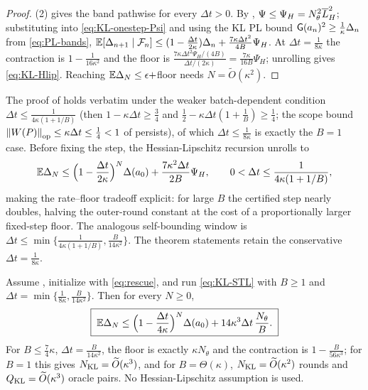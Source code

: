 \begin{proof}
(2) gives the band pathwise for every $\Delta t>0$. By ,
$\Psi\leq\Psi_H=N_\theta^2\overline{L}_H^2$; substituting into \eqref{eq:KL-onestep-Psi} and using the KL
PL bound $\mathsf{G}(a_n)^2\geq\tfrac1\kappa\Delta_n$ from \eqref{eq:PL-bands},
$\mathbb{E}[\Delta_{n+1}\mid\mathcal{F}_n]\leq(1-\tfrac{\Delta t}{2\kappa})\Delta_n+\tfrac{7\kappa\Delta t^2}{4B}\Psi_H$.
At $\Delta t=\tfrac1{8\kappa}$ the contraction is $1-\tfrac1{16\kappa^2}$ and the floor is
$\tfrac{7\kappa\Delta t^2\Psi_H/(4B)}{\Delta t/(2\kappa)}=\tfrac{7\kappa}{16B}\Psi_H$; unrolling gives
\eqref{eq:KL-Hlip}. Reaching $\mathbb{E}\Delta_N\leq\epsilon+$floor needs $N=\widetilde O(\kappa^2)$.
\end{proof}

\begin{remark}
\label{rem:KL-batch}
The proof of  holds verbatim under the weaker batch-dependent condition
$\Delta t\leq\tfrac1{4\kappa(1+1/B)}$ (then $1-\kappa\Delta t\geq\tfrac34$ and
$\tfrac12-\kappa\Delta t(1+\tfrac1B)\geq\tfrac14$; the scope bound
$\left\lVert W(P)\right\rVert_{\mathrm{op}}\leq\kappa\Delta t\leq\tfrac14<1$ of  persists), of which
$\Delta t\leq\tfrac1{8\kappa}$ is exactly the $B=1$ case. Before fixing the step, the
Hessian-Lipschitz recursion unrolls to
\[
    \mathbb{E}\Delta_N\leq\Bigl(1-\frac{\Delta t}{2\kappa}\Bigr)^N\Delta(a_0)+\frac{7\kappa^2\Delta t}{2B}\Psi_H,
    \qquad 0<\Delta t\leq\frac1{4\kappa(1+1/B)},
\]
making the rate--floor tradeoff explicit: for large $B$ the certified step nearly doubles, halving
the outer-round constant at the cost of a proportionally larger fixed-step floor. The analogous
self-bounding window is $\Delta t\leq\min\{\tfrac1{4\kappa(1+1/B)},\tfrac B{14\kappa^2}\}$. The
theorem statements retain the conservative $\Delta t=\tfrac1{8\kappa}$.
\end{remark}

\begin{theorem}
\label{thm:KL-selfbound}
Assume , initialize with \eqref{eq:rescue}, and run \eqref{eq:KL-STL}
with $B\geq1$ and $\Delta t=\min\{\tfrac1{8\kappa},\tfrac B{14\kappa^2}\}$. Then for every $N\geq0$,
\begin{equation}
\label{eq:KL-selfbound}
    \boxed{\;
    \mathbb{E}\Delta_N\leq\Bigl(1-\frac{\Delta t}{4\kappa}\Bigr)^N\Delta(a_0)+14\kappa^3\Delta t\,\frac{N_\theta}B .
    \;}
\end{equation}
For $B\leq\tfrac74\kappa$, $\Delta t=\tfrac B{14\kappa^2}$, the floor is exactly $\kappa N_\theta$ and
the contraction is $1-\tfrac B{56\kappa^3}$; for $B=1$ this gives $N_{\mathrm{KL}}=\widetilde O(\kappa^3)$, and
for $B=\Theta(\kappa)$, $N_{\mathrm{KL}}=\widetilde O(\kappa^2)$ rounds and $Q_{\mathrm{KL}}=\widetilde O(\kappa^3)$
oracle pairs. No Hessian-Lipschitz assumption is used.
\end{theorem}

